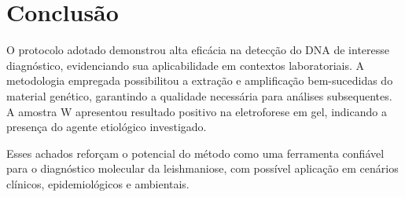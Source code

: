 \section{Conclusão}

O protocolo adotado demonstrou alta eficácia na detecção do DNA de interesse diagnóstico, 
evidenciando sua aplicabilidade em contextos laboratoriais. A metodologia empregada possibilitou 
a extração e amplificação bem-sucedidas do material genético, garantindo a qualidade necessária 
para análises subsequentes. A amostra W apresentou resultado positivo na eletroforese em gel, 
indicando a presença do agente etiológico investigado. 

Esses achados reforçam o potencial do método como uma ferramenta confiável para o diagnóstico 
molecular da leishmaniose, com possível aplicação em cenários clínicos, epidemiológicos e ambientais.